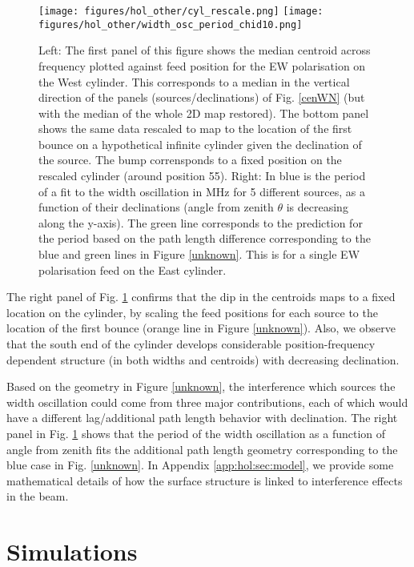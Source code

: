 \begin{figure}[h!]
\begin{center}
\texttt{[image: figures/hol\_other/cyl\_rescale.png]}
\texttt{[image: figures/hol\_other/width\_osc\_period\_chid10.png]}
\caption{Left: The first panel of this figure shows the median centroid across frequency plotted against feed position for the EW polarisation on the West cylinder. This corresponds to a median in the vertical direction of the panels (sources/declinations) of Fig. \ref{cenWN} (but with the median of the whole 2D map restored). The bottom panel shows the same data rescaled to map to the location of the first bounce on a hypothetical infinite cylinder given the declination of the source. The bump corrensponds to a fixed position on the rescaled cylinder (around position 55).
\newline
Right: In blue is the period of a fit to the width oscillation in MHz for 5 different sources, as a function of their declinations (angle from zenith $\theta$ is decreasing along the y-axis). The green line corresponds to the prediction for the period based on the path length difference corresponding to the blue and green lines in Figure \ref{unknown}. This is for a single EW polarisation feed on the East cylinder. \label{confirm}}
\end{center}
\end{figure}

The right panel of Fig. \ref{confirm} confirms that the dip in the centroids maps to a fixed location on the cylinder, by scaling the feed positions for each source to the location of the first bounce (orange line in Figure \ref{unknown}). Also, we observe that the south end of the cylinder develops considerable position-frequency dependent structure (in both widths and centroids) with decreasing declination.

Based on the geometry in Figure \ref{unknown}, the interference which sources the width oscillation could come from three major contributions, each of which would have a different lag/additional path length behavior with declination. The right panel in Fig. \ref{confirm} shows that the period of the width oscillation as a function of angle from zenith fits the additional path length geometry corresponding to the blue case in Fig. \ref{unknown}. In Appendix \ref{app:hol:sec:model}, we provide some mathematical details of how the surface structure is linked to interference effects in the beam.

\section{Simulations} \label{ch:hol:sec:sims}

